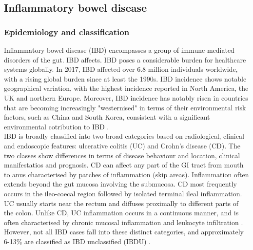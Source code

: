 \subsection{Inflammatory bowel disease}
\subsubsection{Epidemiology and classification}
Inflammatory bowel disease (IBD) encompasses a group of immune-mediated disorders of the gut. IBD affects. IBD poses a considerable burden for healthcare systems globally. In 2017, IBD affected over 6.8 million individuals worldwide, with a rising global burden since at least the 1990s. IBD incidence shows notable geographical variation, with the highest incidence reported in North America, the UK and northern Europe. Moreover, IBD incidence has notably risen in countries that are becoming increasingly "westernised" in terms of their environmental risk factors, such as China and South Korea, consistent with a significant environmental cotribution to IBD \cite{Ng2013-of}.\\

IBD is broadly classified into two broad categories based on radiological, clinical and endoscopic features: ulcerative colitis (UC) and Crohn's disease (CD). The two classes show differences in terms of disease behaviour and location, clinical manifestatios and prognosis. CD can affect any part of the GI tract from mouth to anus characterised by patches of inflammation (skip areas). Inflammation often extends beyond the gut mucosa involving the submucosa. CD most frequently occurs in the ileo-coecal region followed by isolated terminal ileal inflammation. UC usually starts near the rectum and diffuses proximally to different parts of the colon. Unlike CD, UC inflammation occurs in a continuous manner, and is often characterised by chronic mucosal inflammation and leukocyte infiltration \cite{Hendrickson2002-ky}. However, not all IBD cases fall into these distinct categories, and approximately 6-13\% are classified as IBD unclassified (IBDU) \cite{Thurgate2019-xj}.\\


